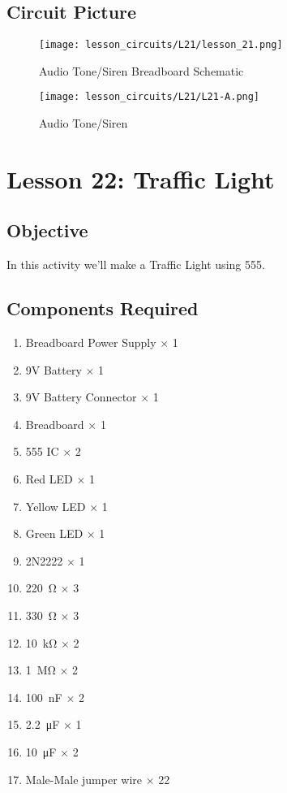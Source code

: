 \subsection{Circuit Picture}
\begin{figure}[!htp]
    \centering
    \texttt{[image: lesson\_circuits/L21/lesson\_21.png]}
    \caption{Audio Tone/Siren Breadboard Schematic}
    \label{fig:555_audsi_sch}
\end{figure}
\begin{figure}[!htp]
    \centering
    \texttt{[image: lesson\_circuits/L21/L21-A.png]}
    \caption{Audio Tone/Siren}
    \label{fig:555_audsi_obb}
\end{figure}
\section{Lesson 22: Traffic Light}
\subsection{Objective}
In this activity we'll make a Traffic Light using 555.
\subsection{Components Required}
\begin{enumerate}
    \item Breadboard Power Supply $\times$ 1
    \item 9V Battery $\times$ 1
    \item 9V Battery Connector $\times$ 1
    \item Breadboard $\times$ 1
    \item 555 IC $\times$ 2
    \item Red LED $\times$ 1
    \item Yellow LED $\times$ 1
    \item Green LED $\times$ 1
    \item 2N2222 $\times$ 1
    \item \SI{220}{\ohm} $\times$ 3
    \item \SI{330}{\ohm} $\times$ 3
    \item \SI{10}{\kilo\ohm} $\times$ 2
    \item \SI{1}{\Mohm} $\times$ 2
    \item \SI{100}{\nano\farad} $\times$ 2
    \item \SI{2.2}{\micro\farad} $\times$ 1
    \item \SI{10}{\micro\farad} $\times$ 2
    \item Male-Male jumper wire $\times$ 22
\end{enumerate}
